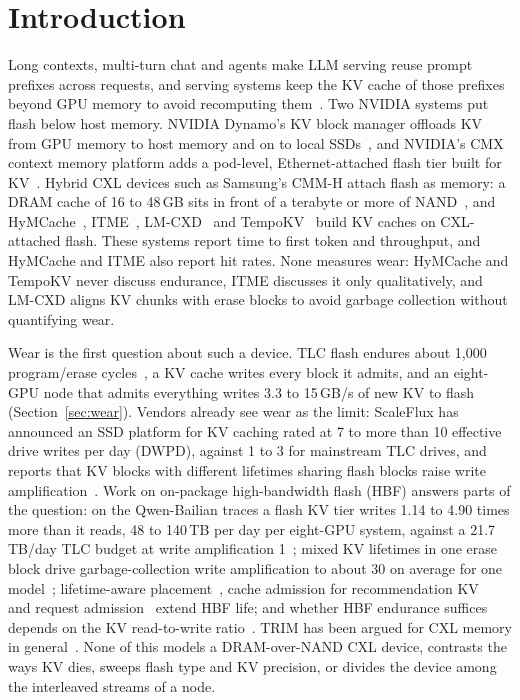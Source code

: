 \documentclass[acmsmall,screen,review]{acmart}
\begin{document}
\maketitle

\section{Introduction}
Long contexts, multi-turn chat and agents make LLM serving reuse prompt prefixes across requests, and serving systems
keep the KV cache of those prefixes beyond GPU memory to avoid recomputing
them~\cite{mooncake,lmcache,kvwild}. Two NVIDIA systems put flash below host memory. NVIDIA
Dynamo's KV block manager offloads KV from GPU memory to host memory and on to local
SSDs~\cite{dynamo_kvbm}, and NVIDIA's CMX context memory platform adds a pod-level,
Ethernet-attached flash tier built for KV~\cite{nvidia_cmx}. Hybrid CXL devices such as Samsung's
CMM-H attach flash as memory: a DRAM cache of 16 to 48\,GB sits in front of a terabyte or more of
NAND~\cite{cmmh,cmmh_hs}, and HyMCache~\cite{hymcache}, ITME~\cite{itme}, LM-CXD~\cite{lmcxd} and
TempoKV~\cite{tempokv} build KV caches on CXL-attached flash. These systems report time to first
token and throughput, and HyMCache and ITME also report hit rates. None measures wear: HyMCache and
TempoKV never discuss endurance, ITME discusses it only qualitatively, and LM-CXD aligns KV chunks
with erase blocks to avoid garbage collection without quantifying wear.

Wear is the first question about such a device. TLC flash endures about 1,000
program/erase cycles~\cite{cai_proc}, a KV cache writes every block it admits, and an eight-GPU node
that admits everything writes 3.3 to 15\,GB/s of new KV to flash (Section~\ref{sec:wear}). Vendors already see wear as the limit: ScaleFlux has
announced an SSD platform for KV caching rated at 7 to more than 10 effective drive writes per day
(DWPD), against 1 to 3 for mainstream TLC drives, and reports that KV blocks with different lifetimes
sharing flash blocks raise write amplification~\cite{scaleflux}. Work on on-package high-bandwidth
flash (HBF) answers parts of the question: on the Qwen-Bailian traces a flash KV tier writes 1.14 to
4.90 times more than it reads, 48 to 140\,TB per day per eight-GPU system, against a 21.7\,TB/day
TLC budget at write amplification 1~\cite{hbfsucks}; mixed KV lifetimes in one erase block drive
garbage-collection write amplification to about 30 on average for one model~\cite{hbflex};
lifetime-aware placement~\cite{hbflex,lachesis}, cache admission for recommendation
KV~\cite{huawei_hbf} and request admission~\cite{berkeley_hbf} extend HBF life; and whether HBF
endurance suffices depends on the KV read-to-write ratio~\cite{son_hbf,kyung_hbf}. TRIM has been
argued for CXL memory in general~\cite{trimcxl}. None of this models a DRAM-over-NAND CXL device,
contrasts the ways KV dies, sweeps flash type and KV precision, or divides the device among the
interleaved streams of a node.
\end{document}
